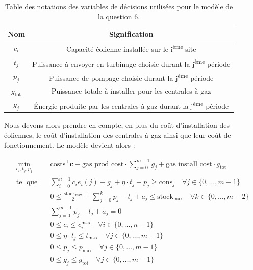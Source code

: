 \documentclass{article}
\begin{document}
\begin{table}[h!]
    \centering
    \renewcommand{\arraystretch}{1.5}%
    \begin{tabular}{|c || c |} 
        \hline
        Nom & Signification\\
        \hline\hline
        $c_i$ & Capacité éolienne installée sur le i\textsuperscript{ème} site\\
        $t_j$ & Puissance à envoyer en turbinage choisie durant la j\textsuperscript{ème} période\\
        $p_j$ & Puissance de pompage choisie durant la j\textsuperscript{ème} période\\
        $g_\mathrm{tot}$ & Puissance totale à installer pour les centrales à gaz\\
        $g_j$ & \'Energie produite par les centrales à gaz durant la j\textsuperscript{ème} période\\
        \hline
    \end{tabular}
    \caption{Table des notations des variables de décisions utilisées pour le modèle de la question 6.} 
    \label{table:notations_variables_6}
\end{table}

\noindent Nous devons alors prendre en compte, en plus du coût d'installation des éoliennes, le coût d'installation des centrales à gaz ainsi que leur coût de fonctionnement.
Le modèle devient alors :

\begin{align}
    \min_{c_{i},t_j,p_j} \quad &\mathrm{costs}^\intercal\mathbf{c} + \mathrm{gas\_prod\_cost}\cdot \sum_{j=0}^{m-1} g_j + \mathrm{gas\_install\_cost} \cdot g_\mathrm{tot}\nonumber\\
    \textrm{tel que} \quad & \sum_{i=0}^{n-1} c_i e_i(j) + g_j + \eta \cdot t_j - p_j \ge \mathrm{cons}_j \quad \forall j \in  \{ 0, \ldots, m-1 \}\label{eq:6_contr1}\\
    & 0 \le \frac{\mathrm{stock}_\mathrm{max}}{2}  + \sum_{j=0}^{k} p_j - t_j + a_j \le  \mathrm{stock}_\mathrm{max} \quad \forall k \in \{ 0, \ldots, m-2 \}\label{eq:6_contr2}\\
    & \sum_{j=0}^{m-1} p_j - t_j + a_j = 0 \label{eq:6_contr3}\\
    & 0 \le c_i \le c_i^\mathrm{max} \quad \forall i \in  \{ 0, \ldots, n-1 \}  \label{eq:6_contr4}\\
    & 0 \le \eta \cdot t_j \le  t_\mathrm{max} \quad \forall j \in  \{ 0, \ldots, m-1 \}  \label{eq:6_contr5}\\
    & 0 \le p_j \le  p_\mathrm{max} \quad \forall j \in  \{ 0, \ldots, m-1 \} \label{eq:6_contr6}\\
    & 0 \le g_j \le g_\mathrm{tot} \quad \forall j \in  \{ 0, \ldots, m-1 \} \label{eq:6_contr7}
\end{align}
\end{document}
